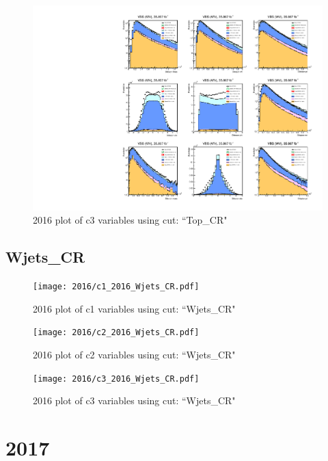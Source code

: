 \documentclass{article}
\begin{document}
                        \begin{figure}[H]
                            \centering
                            \caption{2016 plot of c3 variables using cut: ``Top\_CR"}
                            \includegraphics[width=\textwidth]{2016/c3_2016_Top_CR.pdf}
                        \end{figure}    
      \subsection*{Wjets\_CR}
                        \begin{figure}[H]
                            \centering
                            \caption{2016 plot of c1 variables using cut: ``Wjets\_CR"}
                            \texttt{[image: 2016/c1\_2016\_Wjets\_CR.pdf]}
                        \end{figure}    
                        \begin{figure}[H]
                            \centering
                            \caption{2016 plot of c2 variables using cut: ``Wjets\_CR"}
                            \texttt{[image: 2016/c2\_2016\_Wjets\_CR.pdf]}
                        \end{figure}    
                        \begin{figure}[H]
                            \centering
                            \caption{2016 plot of c3 variables using cut: ``Wjets\_CR"}
                            \texttt{[image: 2016/c3\_2016\_Wjets\_CR.pdf]}
                        \end{figure}    
    \section*{2017}
\end{document}
